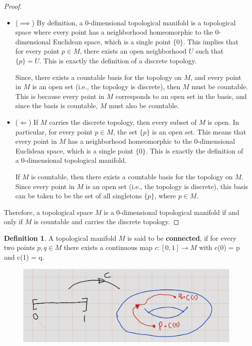 \documentclass[
]{book}
\theoremstyle{definition}
\newtheorem{definition}{Definition}[chapter]
\theoremstyle{definition}
\theoremstyle{definition}
\theoremstyle{definition}
\theoremstyle{remark}
\begin{document}
\begin{proof}
\leavevmode

\begin{itemize}
\item
  (\(\implies\)) By definition, a 0-dimensional topological manifold is a topological space where every point has a neighborhood homeomorphic to the 0-dimensional Euclidean space, which is a single point \(\{0\}\). This implies that for every point \(p \in M\), there exists an open neighborhood \(U\) such that \(\{p\} = U\). This is exactly the definition of a discrete topology.

  Since, there exists a countable basis for the topology on \(M\), and every point in \(M\) is an open set (i.e., the topology is discrete), then \(M\) must be countable. This is because every point in \(M\) corresponds to an open set in the basis, and since the basis is countable, \(M\) must also be countable.
\item
  (\(\Longleftarrow\)) If \(M\) carries the discrete topology, then every subset of \(M\) is open. In particular, for every point \(p \in M\), the set \(\{p\}\) is an open set. This means that every point in \(M\) has a neighborhood homeomorphic to the 0-dimensional Euclidean space, which is a single point \(\{0\}\). This is exactly the definition of a 0-dimensional topological manifold.

  If \(M\) is countable, then there exists a countable basis for the topology on \(M\). Since every point in \(M\) is an open set (i.e., the topology is discrete), this basis can be taken to be the set of all singletons \(\{p\}\), where \(p \in M\).
\end{itemize}

Therefore, a topological space \(M\) is a 0-dimensional topological manifold if and only if \(M\) is countable and carries the discrete topology.

\end{proof}

\begin{definition}
\protect\hypertarget{def:unnamed-chunk-16}{}\label{def:unnamed-chunk-16}A topological manifold \(M\) is said to be \textbf{connected}, if for every two points \(p, q \in M\) there exists a continuous map \(c : [0, 1] \to M\) with c(0) = p and c(1) = q.
\end{definition}

\begin{figure}
\centering
\includegraphics{figures/ch1/fig08.png}
\caption{\label{fig:fig08}\(~\)}
\end{figure}
\end{document}
